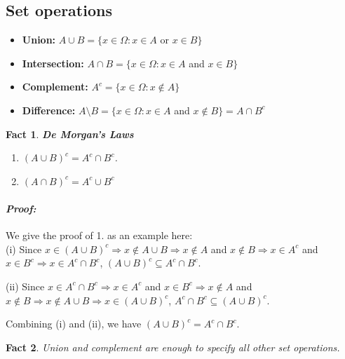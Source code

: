 \subsection{Set operations}
\begin{itemize}
  \item \textbf{Union:} \(A \cup B=\{x \in \Omega: x \in A\) or \(x \in B\}\)
  \item \textbf{Intersection:} \(A \cap B=\{x \in \Omega: x \in A\) and \(x \in B\}\)
  \item \textbf{Complement:} \(A^{c}=\{x \in \Omega: x \notin A\}\)
  \item \textbf{Difference:} \(A \setminus B=\{x \in \Omega: x \in A\) and \(x \notin B\}=A \cap B^{c}\)
\end{itemize}

\newtheorem{fact}{Fact}
  
\begin{fact}\textbf{De Morgan's Laws}
\begin{enumerate}
\item \((A \cup B)^{c}=A^{c} \cap B^{c}\).
\item \((A \cap B)^{c}=A^{c} \cup B^{c}\)
\end{enumerate}
\end{fact}
\paragraph*{\emph{Proof:}} We give the proof of 1. as an example here:\\
(i) Since \(x \in(A \cup B)^{c} \Rightarrow x \notin A \cup B \Rightarrow 
x \notin A\) and \(x \notin B \Rightarrow x \in A^{c}\) and \(x \in
B^{c} \Rightarrow x \in A^{c} \cap B^c\), 
\((A \cup B)^{c} \subseteq A^{c} \cap B^{c}\).

(ii) Since \(x \in A^{c} \cap B^{c} \Rightarrow x \in A^{c}\)
and \(x \in B^{c} \Rightarrow x \notin A\) and \(x \notin B
\Rightarrow x \notin A \cup B \Rightarrow x \in(A \cup B)^{c}\),
\(A^{c} \cap B^{c} \subseteq (A \cup B)^{c}\).

Combining (i) and (ii), we have \((A \cup B)^{c} = A^{c} \cap B^{c}\).

\begin{fact}
Union and complement are enough to specify all other set operations.
\end{fact}

